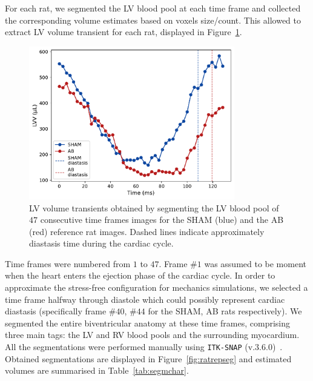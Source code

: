 \vspace{0.2cm}
For each rat, we segmented the LV blood pool at each time frame and collected the corresponding volume estimates based on voxels size/count. This allowed to extract LV volume transient for each rat, displayed in Figure~\ref{fig:lvvexptransients}.

\begin{figure}[!ht]
    \myfloatalign
    \includegraphics[width=0.8\textwidth]{figures/chapter04/lvv_experimental_transient.pdf}
    \caption{LV volume transients obtained by segmenting the LV blood pool of $47$ consecutive time frames images for the SHAM (blue) and the AB (red) reference rat images. Dashed lines indicate approximately diastasis time during the cardiac cycle.}
    \label{fig:lvvexptransients}
\end{figure}

\vspace{0.2cm}
Time frames were numbered from $1$ to $47$. Frame $\#1$ was assumed to be moment when the heart enters the ejection phase of the cardiac cycle. In order to approximate the stress-free configuration for mechanics simulations, we selected a time frame halfway through diastole which could possibly represent cardiac diastasis (specifically frame $\#40$, $\#44$ for the SHAM, AB rats respectively). We segmented the entire biventricular anatomy at these time frames, comprising three main tags: the LV and RV blood pools and the surrounding myocardium. All the segmentations were performed manually using \texttt{ITK-SNAP} (v.$3.6.0$)~\cite{Yushkevich:2006}. Obtained segmentations are displayed in Figure~\ref{fig:ratrepseg} and estimated volumes are summarised in Table~\ref{tab:segmchar}.


